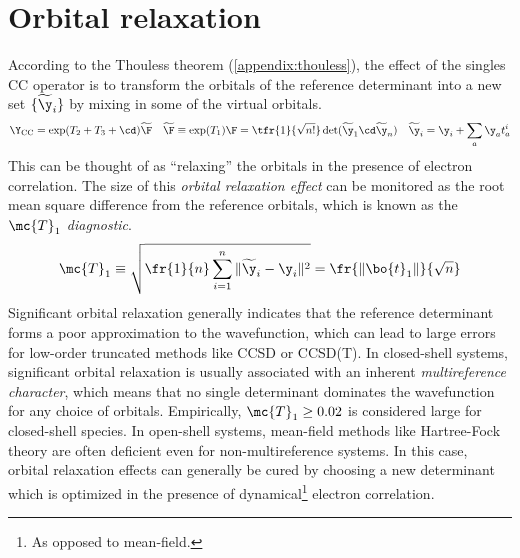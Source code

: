 \chapter{Orbital relaxation}


\begin{rmk}
According to the Thouless theorem (\cref{appendix:thouless}), the effect of the singles CC operator is to transform the orbitals of the reference determinant into a new set $\{\widetilde{\y}_i\}$ by mixing in some of the virtual orbitals.
\begin{align}
  \Y_{\text{CC}}
=
  \text{exp}(T_2 + T_3 + \cd)
  \widetilde{\F}
&&
  \widetilde{\F}
\equiv
  \text{exp}(T_1)
  \F
=
  \tfr{1}{\sqrt{n!}}\,
  \text{det}(\widetilde{\y}_1\cd \widetilde{\y}_n)
&&
  \widetilde{\y}_i
=
  \y_i
+
  \sum_a
  \y_a
  t_a^i
\end{align}
This can be thought of as ``relaxing'' the orbitals in the presence of electron correlation.
The size of this \textit{orbital relaxation effect} can be monitored as the root mean square difference from the reference orbitals, which is known as the \textit{$\mc{T}_1$ diagnostic}.
\begin{align}
  \mc{T}_1
\equiv
  \sqrt{
  \fr{1}{n}
  \sum_{i=1}^n
  \|\widetilde{\y}_i - \y_i\|^2
  }
=
  \fr{\|\bo{t}_1\|}{\sqrt{n}}
\end{align}
Significant orbital relaxation generally indicates that the reference determinant forms a poor approximation to the wavefunction, which can lead to large errors for low-order truncated methods like CCSD or CCSD(T).
In closed-shell systems, significant orbital relaxation is usually associated with an inherent \textit{multireference character}, which means that no single determinant dominates the wavefunction for any choice of orbitals.
Empirically, $\mc{T}_1\geq 0.02$ is considered large for closed-shell species.
In open-shell systems, mean-field methods like Hartree-Fock theory are often deficient even for non-multireference systems.
In this case, orbital relaxation effects can generally be cured by choosing a new determinant which is optimized in the presence of dynamical\footnote{As opposed to mean-field.} electron correlation.
\end{rmk}

